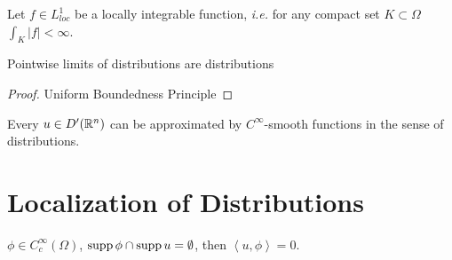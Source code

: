 \begin{example}
    Let $f\in L^1_{loc}$ be a locally integrable function, \emph{i.e.} for any compact set $K\subset\Omega$ $\int_K |f|<\infty$.
\end{example}

\begin{definition}
    
\end{definition}

\begin{definition}[Mollifiers]
    
\end{definition}

Pointwise limits of distributions are distributions
\begin{theorem}
    
\end{theorem}
\begin{proof}
    Uniform Boundedness Principle
\end{proof}

\begin{theorem}
    Every $u\in D'(\mathbb{R}^n)$ can be approximated by $C^\infty$-smooth functions in the sense of distributions.
\end{theorem}

\section{Localization of Distributions}

\begin{theorem}
    $\phi\in C_c^\infty(\Omega)$, $\operatorname{supp} \phi\cap\operatorname{supp} u=\emptyset$, then $\left\langle u,\phi\right\rangle=0$.
\end{theorem}